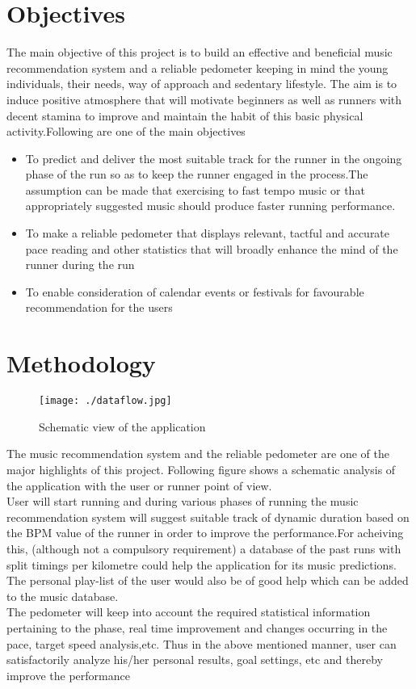 \documentclass[10pt, a4paper]{article}
\begin{document}
\section{Objectives}

The main objective of this project is to build an effective and beneficial music recommendation system and a reliable pedometer keeping in mind the young individuals, their needs, way of approach and sedentary lifestyle. The aim is to induce positive atmosphere that will motivate beginners as well as runners with decent stamina to improve and maintain the habit of this basic physical activity.Following are one of 
the main objectives 
\begin{itemize}
\item To predict and deliver the most suitable track for the runner in the ongoing phase of the run so as to keep the runner engaged in the process.The assumption can be made that exercising to fast tempo music or that appropriately suggested music should produce faster running performance.
\item To make a reliable pedometer that displays relevant, tactful and accurate pace reading and other statistics that will broadly enhance the mind of the runner during the run
\item To enable consideration of calendar events or festivals for favourable recommendation for the users 
\end{itemize}



\section{Methodology}

\begin{figure}[ht]
\begin{center}
\texttt{[image: ./dataflow.jpg]}
\end{center}
\caption{Schematic view of the application}
\label{Fig 1}
\end{figure}
The music recommendation system and the reliable pedometer are one of the major highlights of this project. Following figure shows a schematic analysis of the application with the user or runner point of view.\\
User will start running and during various phases of running the music recommendation system will suggest suitable track of dynamic duration based on the BPM value of the runner in order to improve the performance.For acheiving this, (although not a compulsory requirement) a database of the past runs with split timings per kilometre could help the application for its music predictions. The personal play-list of the user would also be of good help which can be added to the music database. \\
The pedometer will keep into account the required statistical information pertaining to the phase, real time improvement and changes occurring in the pace, target speed analysis,etc. Thus in the above mentioned manner, user can satisfactorily analyze his/her personal results, goal settings, etc and thereby improve the performance 
\end{document}
